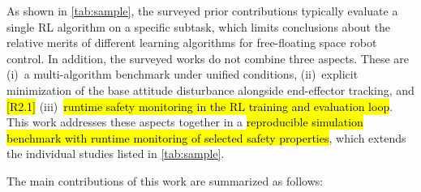 \documentclass{ieeeaccess}
\newcommand{\hlone}[1]{{\sethlcolor{rone}\hl{#1}}}
\begin{document}
As shown in \cref{tab:sample}, the surveyed prior contributions typically evaluate a single RL algorithm
on a specific subtask, which limits conclusions about the relative merits of different learning
algorithms for free-floating space robot control. In addition, the surveyed works do not combine three
aspects. These are (i)~a multi-algorithm benchmark under unified conditions, (ii)~explicit minimization
of the base attitude disturbance alongside end-effector tracking, and \hlone{[R2.1]}
(iii)~\hlone{runtime safety monitoring in the RL training and evaluation loop}. This
work addresses these aspects together in a \hlone{reproducible simulation benchmark with runtime
monitoring of selected safety properties}, which extends the individual studies listed in
\cref{tab:sample}.

The main contributions of this work are summarized as follows:
\end{document}
